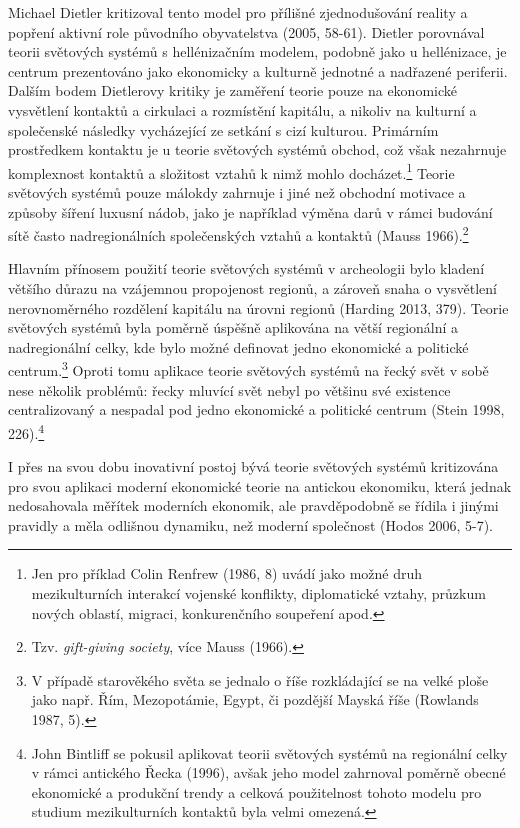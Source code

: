 Michael Dietler kritizoval tento model pro přílišné zjednodušování reality a popření aktivní role původního obyvatelstva (2005, 58-61). Dietler porovnával teorii světových systémů s hellénizačním modelem, podobně jako u hellénizace, je centrum prezentováno jako ekonomicky a kulturně jednotné a nadřazené periferii. Dalším bodem Dietlerovy kritiky je zaměření teorie pouze na ekonomické vysvětlení kontaktů a cirkulaci a rozmístění kapitálu, a nikoliv na kulturní a společenské následky vycházející ze setkání s cizí kulturou. Primárním prostředkem kontaktu je u teorie světových systémů obchod, což však nezahrnuje komplexnost kontaktů a složitost vztahů k nimž mohlo docházet.\footnote{Jen pro příklad Colin Renfrew (1986, 8) uvádí jako možné druh mezikulturních interakcí vojenské konflikty, diplomatické vztahy, průzkum nových oblastí, migraci, konkurenčního soupeření apod.} Teorie světových systémů pouze málokdy zahrnuje i jiné než obchodní motivace a způsoby šíření luxusní nádob, jako je například výměna darů v rámci budování sítě často nadregionálních společenských vztahů a kontaktů (Mauss 1966).\footnote{Tzv. {\em gift-giving society}, více Mauss (1966).}

Hlavním přínosem použití teorie světových systémů v archeologii bylo kladení většího důrazu na vzájemnou propojenost regionů, a zároveň snaha o vysvětlení nerovnoměrného rozdělení kapitálu na úrovni regionů (Harding 2013, 379). Teorie světových systémů byla poměrně úspěšně aplikována na větší regionální a nadregionální celky, kde bylo možné definovat jedno ekonomické a politické centrum.\footnote{V případě starověkého světa se jednalo o říše rozkládající se na velké ploše jako např. Řím, Mezopotámie, Egypt, či pozdější Mayská říše (Rowlands 1987, 5).} Oproti tomu aplikace teorie světových systémů na řecký svět v sobě nese několik problémů: řecky mluvící svět nebyl po většinu své existence centralizovaný a nespadal pod jedno ekonomické a politické centrum (Stein 1998, 226).\footnote{John Bintliff se pokusil aplikovat teorii světových systémů na regionální celky v rámci antického Řecka (1996), avšak jeho model zahrnoval poměrně obecné ekonomické a produkční trendy a celková použitelnost tohoto modelu pro studium mezikulturních kontaktů byla velmi omezená.}

I přes na svou dobu inovativní postoj bývá teorie světových systémů kritizována pro svou aplikaci moderní ekonomické teorie na antickou ekonomiku, která jednak nedosahovala měřítek moderních ekonomik, ale pravděpodobně se řídila i jinými pravidly a měla odlišnou dynamiku, než moderní společnost (Hodos 2006, 5-7).

